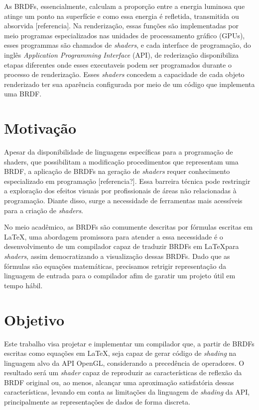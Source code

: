 \documentclass[english, 
               brazil, 
               bsc] %
               {dcomp-abntex2}
\begin{document}
As BRDFs, essencialmente, calculam a proporção entre a energia luminosa que atinge um ponto na superfície e como essa energia é refletida, transmitida ou absorvida [referencia]. Na renderização, essas funções são implementadas por meio programas especializados nas unidades de processamento gráfico (GPUs), esses programmas são chamados de \textit{shaders}, e cada interface de programação, do inglês \textit{ Application Programming Interface} (API), de rederização disponibiliza etapas diferentes onde esses executaveis podem ser programados durante o processo de renderização. Esses \textit{shaders} concedem a capacidade de cada objeto renderizado ter sua aparência configurada por meio de um código que implementa uma BRDF.


\section{Motivação}

Apesar da disponibilidade de linguagens específicas para a programação de shaders, que possibilitam a modificação procedimentos que representam uma BRDF, a aplicação de BRDFs na geração de \textit{shaders} requer conhecimento especializado em programação [referencia?]. Essa barreira técnica pode restringir a exploração dos efeitos visuais por profissionais de áreas não relacionadas à programação. Diante disso, surge a necessidade de ferramentas mais acessíveis para a criação de \textit{shaders}.

No meio acadêmico, as BRDFs são comumente descritas por fórmulas escritas em \LaTeX , uma abordagem promissora para atender a essa necessidade é o desenvolvimento de um compilador capaz de traduzir BRDFs em \LaTeX  para \textit{shaders}, assim democratizando a visualização dessas BRDFs. Dado que as fórmulas são equações matemáticas, precisamos retrigir representação da linguagem de entrada para o compilador afim de garatir um projeto útil em tempo hábil.

\section{Objetivo}
Este trabalho visa projetar e implementar um compilador que, a partir de BRDFs escritas como equações em \LaTeX, seja capaz de gerar código de \textit{shading} na linguagem alvo da API OpenGL, considerando a precedência de operadores. O resultado será um \textit{shader} capaz de reproduzir as características de reflexão da BRDF original ou, ao menos, alcançar uma aproximação satisfatória dessas características, levando em conta as limitações da linguagem de \textit{shading} da API, principalmente as representações de dados de forma discreta. 
\end{document}

